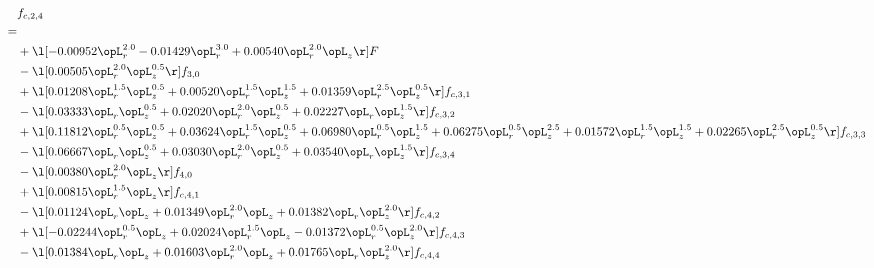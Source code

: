 \begin{alignat}{2} 
\label{eq:f_24_2} 
& f_{c,2,4} \nonumber \\ 
 = \\ 
& + \l[  -0.00952 \opL_r^{2.0}   -0.01429 \opL_r^{3.0} +  0.00540 \opL_r^{2.0} \opL_z  \r] F \nonumber \\ 
& - \l[  0.00505 \opL_r^{2.0} \opL_z^{0.5}  \r] f_{3,0} \nonumber \\ 
& + \l[  0.01208 \opL_r^{1.5} \opL_z^{0.5} +  0.00520 \opL_r^{1.5} \opL_z^{1.5} +  0.01359 \opL_r^{2.5} \opL_z^{0.5}  \r] f_{c,3,1} \nonumber \\ 
& - \l[  0.03333 \opL_r \opL_z^{0.5} +  0.02020 \opL_r^{2.0} \opL_z^{0.5} +  0.02227 \opL_r \opL_z^{1.5}  \r] f_{c,3,2} \nonumber \\ 
& + \l[  0.11812 \opL_r^{0.5} \opL_z^{0.5} +  0.03624 \opL_r^{1.5} \opL_z^{0.5} +  0.06980 \opL_r^{0.5} \opL_z^{1.5} +  0.06275 \opL_r^{0.5} \opL_z^{2.5} +  0.01572 \opL_r^{1.5} \opL_z^{1.5} +  0.02265 \opL_r^{2.5} \opL_z^{0.5}  \r] f_{c,3,3} \nonumber \\ 
& - \l[  0.06667 \opL_r \opL_z^{0.5} +  0.03030 \opL_r^{2.0} \opL_z^{0.5} +  0.03540 \opL_r \opL_z^{1.5}  \r] f_{c,3,4} \nonumber \\ 
& - \l[  0.00380 \opL_r^{2.0} \opL_z  \r] f_{4,0} \nonumber \\ 
& + \l[  0.00815 \opL_r^{1.5} \opL_z  \r] f_{c,4,1} \nonumber \\ 
& - \l[  0.01124 \opL_r \opL_z +  0.01349 \opL_r^{2.0} \opL_z +  0.01382 \opL_r \opL_z^{2.0}  \r] f_{c,4,2} \nonumber \\ 
& + \l[  -0.02244 \opL_r^{0.5} \opL_z +  0.02024 \opL_r^{1.5} \opL_z   -0.01372 \opL_r^{0.5} \opL_z^{2.0}  \r] f_{c,4,3} \nonumber \\ 
& - \l[  0.01384 \opL_r \opL_z +  0.01603 \opL_r^{2.0} \opL_z +  0.01765 \opL_r \opL_z^{2.0}  \r] f_{c,4,4} \nonumber \\ 
\end{alignat} 


